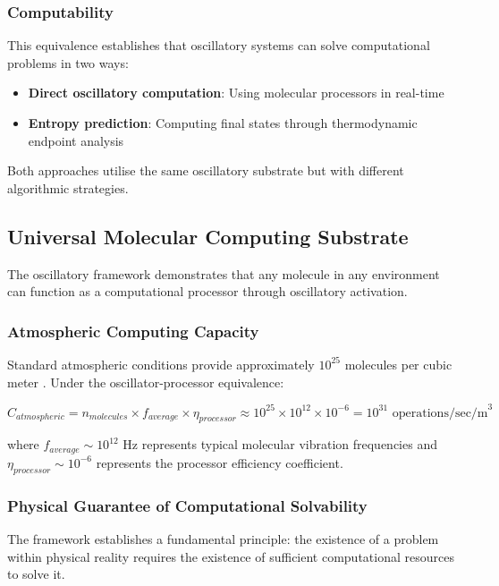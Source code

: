\documentclass[12pt,a4paper]{article}
\begin{document}
\subsubsection{Computability}

This equivalence establishes that oscillatory systems can solve computational problems in two ways:
\begin{itemize}
\item \textbf{Direct oscillatory computation}: Using molecular processors in real-time
\item \textbf{Entropy prediction}: Computing final states through thermodynamic endpoint analysis
\end{itemize}

Both approaches utilise the same oscillatory substrate but with different algorithmic strategies.

\subsection{Universal Molecular Computing Substrate}

The oscillatory framework demonstrates that any molecule in any environment can function as a computational processor through oscillatory activation.

\subsubsection{Atmospheric Computing Capacity}

Standard atmospheric conditions provide approximately $10^{25}$ molecules per cubic meter \cite{lloyd2000ultimate}. Under the oscillator-processor equivalence:

\begin{equation}
C_{atmospheric} = n_{molecules} \times f_{average} \times \eta_{processor} \approx 10^{25} \times 10^{12} \times 10^{-6} = 10^{31} \text{ operations/sec/m}^3
\end{equation}

where $f_{average} \sim 10^{12}$ Hz represents typical molecular vibration frequencies and $\eta_{processor} \sim 10^{-6}$ represents the processor efficiency coefficient.

\subsubsection{Physical Guarantee of Computational Solvability}

The framework establishes a fundamental principle: the existence of a problem within physical reality requires the existence of sufficient computational resources to solve it.
\end{document}
